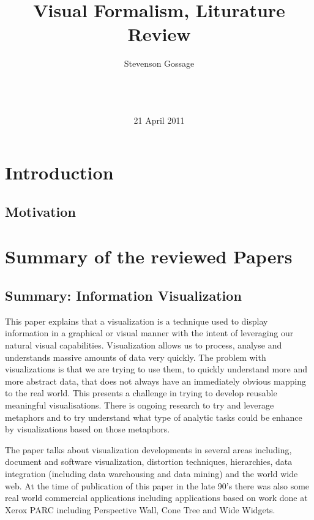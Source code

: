 \documentclass{sig-alternate}
\begin{document}
\title{Visual Formalism, Liturature Review}
\author{ \alignauthor
Stevenson Gossage\\
       \\
       \\
       \\
}
\date{21 April 2011}

\maketitle



\section{Introduction}
\subsection{Motivation}
\section{Summary of the reviewed Papers}
\subsection{Summary: Information Visualization\cite{Gershon:1998:Informationvisualization}}
This paper explains that a visualization is a technique used to display
information in a graphical or visual manner with the intent of leveraging our
natural visual capabilities. Visualization allows us to process, analyse and
understands massive amounts of data very quickly. The problem with
visualizations is that we are trying to use them, to quickly understand more and
more abstract data, that does not always have an immediately obvious mapping to
the real world. This presents a challenge in trying to develop reusable
meaningful visualisations. There is ongoing research to try and leverage
metaphors and to try understand what type of analytic tasks could be enhance by
visualizations based on those metaphors.

The paper talks about visualization developments in several areas including,
document and software visualization, distortion techniques, hierarchies, data
integration (including data warehousing and data mining) and the world wide web.
At the time of publication of this paper in the late 90's there was also some
real world commercial applications including applications based on work done at
Xerox PARC including Perspective Wall, Cone Tree and Wide Widgets.
\end{document}
